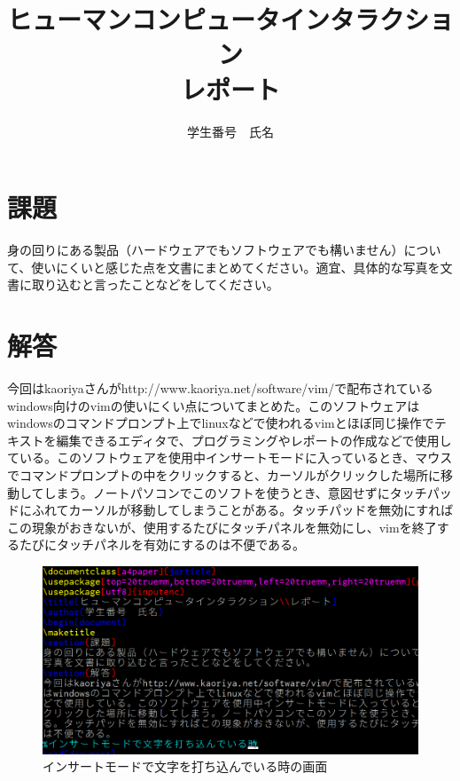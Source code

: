 \documentclass[a4paper]{jarticle}
\title{ヒューマンコンピュータインタラクション\\レポート}
\author{学生番号　氏名}
\begin{document}
\maketitle
\section{課題}
身の回りにある製品（ハードウェアでもソフトウェアでも構いません）について、使いにくいと感じた点を文書にまとめてください。適宜、具体的な写真を文書に取り込むと言ったことなどをしてください。
\section{解答}
今回はkaoriyaさんがhttp://www.kaoriya.net/software/vim/で配布されているwindows向けのvimの使いにくい点についてまとめた。このソフトウェアはwindowsのコマンドプロンプト上でlinuxなどで使われるvimとほぼ同じ操作でテキストを編集できるエディタで、プログラミングやレポートの作成などで使用している。このソフトウェアを使用中インサートモードに入っているとき、マウスでコマンドプロンプトの中をクリックすると、カーソルがクリックした場所に移動してしまう。ノートパソコンでこのソフトを使うとき、意図せずにタッチパッドにふれてカーソルが移動してしまうことがある。タッチパッドを無効にすればこの現象がおきないが、使用するたびにタッチパネルを無効にし、vimを終了するたびにタッチパネルを有効にするのは不便である。
\begin{figure}[H]
	\begin{center}
		\includegraphics[width=15cm]{screenshot1edited.png}
		\caption{インサートモードで文字を打ち込んでいる時の画面}
		\label{screenshot1edited}
	\end{center}
\end{figure}
\end{document}
